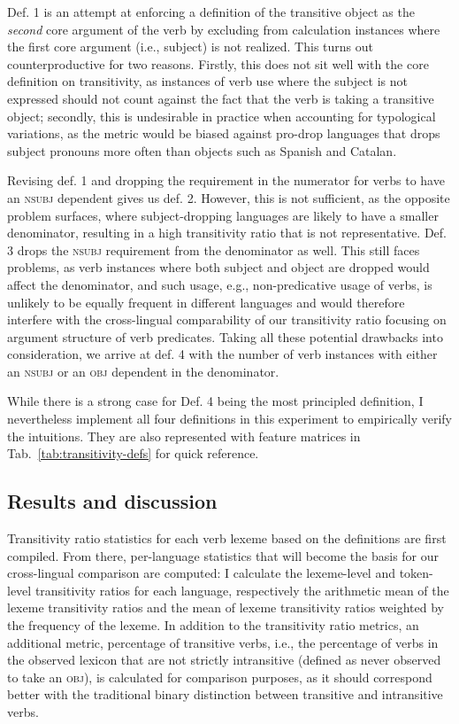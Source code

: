 Def. 1 is an attempt at enforcing a definition of the transitive object as the \textit{second} core argument of the verb by excluding from calculation instances where the first core argument (i.e., subject) is not realized. This turns out counterproductive for two reasons. Firstly, this does not sit well with the core definition on transitivity, as instances of verb use where the subject is not expressed should not count against the fact that the verb is taking a transitive object; secondly, this is undesirable in practice when accounting for typological variations, as the metric would be biased against pro-drop languages that drops subject pronouns more often than objects such as Spanish and Catalan.

Revising def. 1 and dropping the requirement in the numerator for verbs to have an \textsc{nsubj} dependent gives us def. 2. However, this is not sufficient, as the opposite problem surfaces, where subject-dropping languages are likely to have a smaller denominator, resulting in a high transitivity ratio that is not representative. Def. 3 drops the \textsc{nsubj} requirement from the denominator as well. This still faces problems, as verb instances where both subject and object are dropped would affect the denominator, and such usage, e.g., non-predicative usage of verbs, is unlikely to be equally frequent in different languages and would therefore interfere with the cross-lingual comparability of our transitivity ratio focusing on argument structure of verb predicates. Taking all these potential drawbacks into consideration, we arrive at def. 4 with the number of verb instances with either an \textsc{nsubj} or an \textsc{obj} dependent in the denominator. 



While there is a strong case for Def. 4 being the most principled definition, I nevertheless implement all four definitions in this experiment to empirically verify the intuitions. They are also represented with feature matrices in Tab.~\ref{tab:transitivity-defs} for quick reference.

\subsection{Results and discussion}\label{subsec:transitivity-lexicon}

Transitivity ratio statistics for each verb lexeme based on the definitions are first compiled. From there, per-language statistics that will become the basis for our cross-lingual comparison are computed: I calculate the lexeme-level and token-level transitivity ratios for each language, respectively the arithmetic mean of the lexeme transitivity ratios and the mean of lexeme transitivity ratios weighted by the frequency of the lexeme. In addition to the transitivity ratio metrics, an additional metric, percentage of transitive verbs, i.e., the percentage of verbs in the observed lexicon that are not strictly intransitive (defined as never observed to take an \textsc{obj}), is calculated for comparison purposes, as it should correspond better with the traditional binary distinction between transitive and intransitive verbs.

